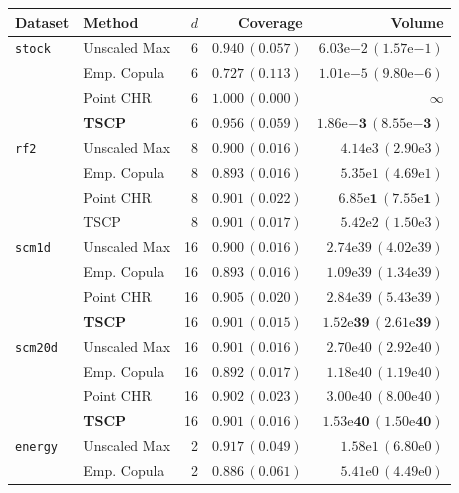 \begin{table}[t]
\centering
\small
\begin{tabular}{llrrr}
\toprule
Dataset & Method & $d$ & Coverage & Volume \\
\midrule
\texttt{stock} & Unscaled Max & 6 & $0.940\,(0.057)$ & $6.03\mathrm{e}{-2}\,(1.57\mathrm{e}{-1})$ \\
 & Emp. Copula & 6 & $0.727\,(0.113)$ & $1.01\mathrm{e}{-5}\,(9.80\mathrm{e}{-6})$ \\
 & Point CHR & 6 & $1.000\,(0.000)$ & $\infty$ \\
 & \textbf{TSCP} & 6 & $0.956\,(0.059)$ & $\mathbf{1.86\mathrm{e}{-3}\,(8.55\mathrm{e}{-3})}$ \\
\addlinespace
\texttt{rf2} & Unscaled Max & 8 & $0.900\,(0.016)$ & $4.14\mathrm{e}{3}\,(2.90\mathrm{e}{3})$ \\
 & Emp. Copula & 8 & $0.893\,(0.016)$ & $5.35\mathrm{e}{1}\,(4.69\mathrm{e}{1})$ \\
 & Point CHR & 8 & $0.901\,(0.022)$ & $\mathbf{6.85\mathrm{e}{1}\,(7.55\mathrm{e}{1})}$ \\
 & TSCP & 8 & $0.901\,(0.017)$ & $5.42\mathrm{e}{2}\,(1.50\mathrm{e}{3})$ \\
\addlinespace
\texttt{scm1d} & Unscaled Max & 16 & $0.900\,(0.016)$ & $2.74\mathrm{e}{39}\,(4.02\mathrm{e}{39})$ \\
 & Emp. Copula & 16 & $0.893\,(0.016)$ & $1.09\mathrm{e}{39}\,(1.34\mathrm{e}{39})$ \\
 & Point CHR & 16 & $0.905\,(0.020)$ & $2.84\mathrm{e}{39}\,(5.43\mathrm{e}{39})$ \\
 & \textbf{TSCP} & 16 & $0.901\,(0.015)$ & $\mathbf{1.52\mathrm{e}{39}\,(2.61\mathrm{e}{39})}$ \\
\addlinespace
\texttt{scm20d} & Unscaled Max & 16 & $0.901\,(0.016)$ & $2.70\mathrm{e}{40}\,(2.92\mathrm{e}{40})$ \\
 & Emp. Copula & 16 & $0.892\,(0.017)$ & $1.18\mathrm{e}{40}\,(1.19\mathrm{e}{40})$ \\
 & Point CHR & 16 & $0.902\,(0.023)$ & $3.00\mathrm{e}{40}\,(8.00\mathrm{e}{40})$ \\
 & \textbf{TSCP} & 16 & $0.901\,(0.016)$ & $\mathbf{1.53\mathrm{e}{40}\,(1.50\mathrm{e}{40})}$ \\
\addlinespace
\texttt{energy} & Unscaled Max & 2 & $0.917\,(0.049)$ & $1.58\mathrm{e}{1}\,(6.80\mathrm{e}{0})$ \\
 & Emp. Copula & 2 & $0.886\,(0.061)$ & $5.41\mathrm{e}{0}\,(4.49\mathrm{e}{0})$ \\

\end{tabular}
\end{table}
